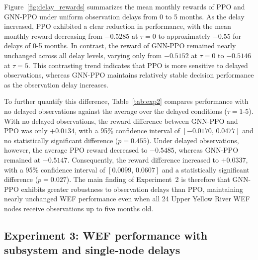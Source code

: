 \documentclass [a4paper,fleqn] {cas-dc}
\begin{document}
Figure~\ref{fig:delay_rewards} summarizes the mean monthly rewards of PPO and GNN-PPO under uniform observation delays from 0 to 5 months. As the delay increased, PPO exhibited a clear reduction in performance, with the mean monthly reward decreasing from $-0.5285$ at $\tau=0$ to approximately $-0.55$ for delays of 0-5 months. In contrast, the reward of GNN-PPO remained nearly unchanged across all delay levels, varying only from $-0.5152$ at $\tau=0$ to $-0.5146$ at $\tau=5$. This contrasting trend indicates that PPO is more sensitive to delayed observations, whereas GNN-PPO maintains relatively stable decision performance as the observation delay increases.

To further quantify this difference, Table~\ref{tab:exp2} compares performance with no delayed observations against the average over the delayed conditions ($\tau=1$-$5$). With no delayed observations, the reward difference between GNN-PPO and PPO was only $+0.0134$, with a 95\% confidence interval of $[-0.0170,\,0.0477]$ and no statistically significant difference ($p=0.455$). Under delayed observations, however, the average PPO reward decreased to $-0.5485$, whereas GNN-PPO remained at $-0.5147$. Consequently, the reward difference increased to $+0.0337$, with a 95\% confidence interval of $[0.0099,\,0.0607]$ and a statistically significant difference ($p=0.027$). The main finding of Experiment~2 is therefore that GNN-PPO exhibits greater robustness to observation delays than PPO, maintaining nearly unchanged WEF performance even when all 24 Upper Yellow River WEF nodes receive observations up to five months old.

\subsection{Experiment 3: WEF performance with subsystem and single-node delays}
\label{sec44}
\end{document}
